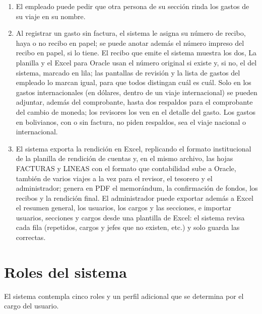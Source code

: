 \documentclass[11pt,letterpaper]{article}
\begin{document}
\begin{enumerate}
  \item El empleado puede pedir que otra persona de su sección rinda los gastos de su viaje en su nombre.
  \item Al registrar un gasto sin factura, el sistema le asigna su número de recibo, haya o no recibo en papel; se puede anotar además el número impreso del recibo en papel, si lo tiene. El recibo que emite el sistema muestra los dos, La planilla y el Excel para Oracle usan el número original si existe y, si no, el del sistema, marcado en lila; las pantallas de revisión y la lista de gastos del empleado lo marcan igual, para que todos distingan cuál es cuál. Solo en los gastos internacionales (en dólares, dentro de un viaje internacional) se pueden adjuntar, además del comprobante, hasta dos respaldos para el comprobante del cambio de moneda; los revisores los ven en el detalle del gasto. Los gastos en bolivianos, con o sin factura, no piden respaldos, sea el viaje nacional o internacional.
  \item El sistema exporta la rendición en Excel, replicando el formato institucional de la planilla de rendición de cuentas y, en el mismo archivo, las hojas FACTURAS y LINEAS con el formato que contabilidad sube a Oracle, también de varios viajes a la vez para el revisor, el tesorero y el administrador; genera en PDF el memorándum, la confirmación de fondos, los recibos y la rendición final. El administrador puede exportar además a Excel el resumen general, los usuarios, los cargos y las secciones, e importar usuarios, secciones y cargos desde una plantilla de Excel: el sistema revisa cada fila (repetidos, cargos y jefes que no existen, etc.) y solo guarda las correctas.
\end{enumerate}

\section{Roles del sistema}
El sistema contempla cinco roles y un perfil adicional que se determina por el cargo del usuario.
\end{document}

